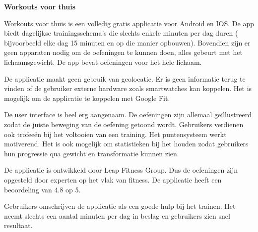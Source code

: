 \textbf{Workouts voor thuis}

Workouts voor thuis is een volledig gratis applicatie voor Android en IOS. De app biedt dagelijkse trainingsschema’s die slechts enkele minuten per dag duren ( bijvoorbeeld elke dag 15 minuten en op die manier opbouwen). Bovendien zijn er geen apparaten nodig om de oefeningen te kunnen doen, alles gebeurt met het lichaamsgewicht. De app bevat oefeningen voor het hele lichaam.

De applicatie maakt geen gebruik van geolocatie. Er is geen informatie terug te vinden of de gebruiker externe hardware zoals smartwatches kan koppelen. Het is mogelijk om de applicatie te koppelen met Google Fit.

De user interface is heel erg aangenaam. De oefeningen zijn allemaal geïllustreerd zodat de juiste beweging van de oefening getoond wordt. Gebruikers verdienen ook trofeeën bij het voltooien van een training. Het puntensysteem werkt motiverend. Het is ook mogelijk om statistieken bij het houden zodat gebruikers hun progressie qua gewicht en transformatie kunnen zien.

De applicatie is ontwikkeld door Leap Fitness Group. Dus de oefeningen zijn opgesteld door experten op het vlak van fitness. De applicatie heeft een beoordeling van 4.8 op 5.

Gebruikers omschrijven de applicatie als een goede hulp bij het trainen. Het neemt slechts een aantal minuten per dag in beslag en gebruikers zien snel resultaat. 
